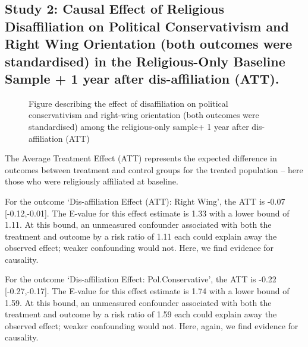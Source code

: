 \documentclass[
  singlecolumn]{article}
\begin{document}
\newpage{}

\subsection{Study 2: Causal Effect of Religious Disaffiliation on
Political Conservativism and Right Wing Orientation (both outcomes were
standardised) in the Religious-Only Baseline Sample + 1 year after
dis-affiliation
(ATT).}\label{study-2-causal-effect-of-religious-disaffiliation-on-political-conservativism-and-right-wing-orientation-both-outcomes-were-standardised-in-the-religious-only-baseline-sample-1-year-after-dis-affiliation-att.}

\begin{figure}


\caption{\label{fig-att}Figure describing the effect of disaffiliation
on political conservativism and right-wing orientation (both outcomes
were standardised) among the religious-only sample+ 1 year after
dis-affiliation (ATT)}

\end{figure}%

\begin{table}

\caption{\label{tbl-att}}

\centering{

\captionsetup{labelsep=none}

}

\end{table}%

The Average Treatment Effect (ATT) represents the expected difference in
outcomes between treatment and control groups for the treated population
-- here those who were religiously affiliated at baseline.

For the outcome `Dis-affiliation Effect (ATT): Right Wing', the ATT is
-0.07 {[}-0.12,-0.01{]}. The E-value for this effect estimate is 1.33
with a lower bound of 1.11. At this bound, an unmeasured confounder
associated with both the treatment and outcome by a risk ratio of 1.11
each could explain away the observed effect; weaker confounding would
not. Here, we find evidence for causality.

For the outcome `Dis-affiliation Effect: Pol.Conservative', the ATT is
-0.22 {[}-0.27,-0.17{]}. The E-value for this effect estimate is 1.74
with a lower bound of 1.59. At this bound, an unmeasured confounder
associated with both the treatment and outcome by a risk ratio of 1.59
each could explain away the observed effect; weaker confounding would
not. Here, again, we find evidence for causality.
\end{document}
